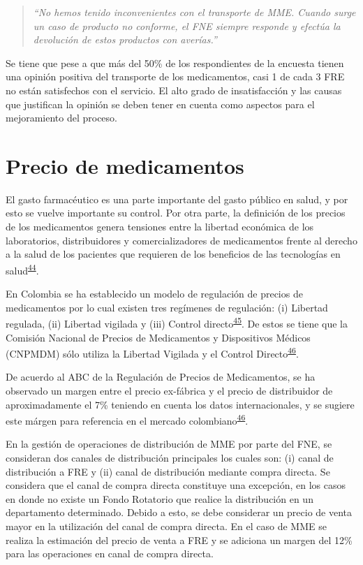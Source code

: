 \documentclass[
]{book}
\begin{document}
\begin{quote}
\emph{``No hemos tenido inconvenientes con el transporte de MME. Cuando surge un caso de producto no conforme, el FNE siempre responde y efectúa la devolución de estos productos con averías.''}
\end{quote}

Se tiene que pese a que más del 50\% de los respondientes de la encuesta tienen una opinión positiva del transporte de los medicamentos, casi 1 de cada 3 FRE no están satisfechos con el servicio. El alto grado de insatisfacción y las causas que justifican la opinión se deben tener en cuenta como aspectos para el mejoramiento del proceso.

\hypertarget{precioMedicamentos}{%
\section{Precio de medicamentos}\label{precioMedicamentos}}


El gasto farmacéutico es una parte importante del gasto público en salud, y por esto se vuelve importante su control. Por otra parte, la definición de los precios de los medicamentos genera tensiones entre la libertad económica de los laboratorios, distribuidores y comercializadores de medicamentos frente al derecho a la salud de los pacientes que requieren de los beneficios de las tecnologías en salud\textsuperscript{\protect\hyperlink{ref-AvilaRoncancio2019}{44}}.

En Colombia se ha establecido un modelo de regulación de precios de medicamentos por lo cual existen tres regímenes de regulación: (i) Libertad regulada, (ii) Libertad vigilada y (iii) Control directo\textsuperscript{\protect\hyperlink{ref-CongresodelaRepublicadeColombia1988}{45}}. De estos se tiene que la Comisión Nacional de Precios de Medicamentos y Dispositivos Médicos (CNPMDM) sólo utiliza la Libertad Vigilada y el Control Directo\textsuperscript{\protect\hyperlink{ref-SecretariaTecnicaCNPDM-2019}{46}}.

De acuerdo al ABC de la Regulación de Precios de Medicamentos, se ha observado un margen entre el precio ex-fábrica y el precio de distribuidor de aproximadamente el 7\% teniendo en cuenta los datos internacionales, y se sugiere este márgen para referencia en el mercado colombiano\textsuperscript{\protect\hyperlink{ref-SecretariaTecnicaCNPDM-2019}{46}}.

En la gestión de operaciones de distribución de MME por parte del FNE, se consideran dos canales de distribución principales los cuales son: (i) canal de distribución a FRE y (ii) canal de distribución mediante compra directa. Se considera que el canal de compra directa constituye una excepción, en los casos en donde no existe un Fondo Rotatorio que realice la distribución en un departamento determinado. Debido a esto, se debe considerar un precio de venta mayor en la utilización del canal de compra directa. En el caso de MME se realiza la estimación del precio de venta a FRE y se adiciona un margen del 12\% para las operaciones en canal de compra directa.
\end{document}
